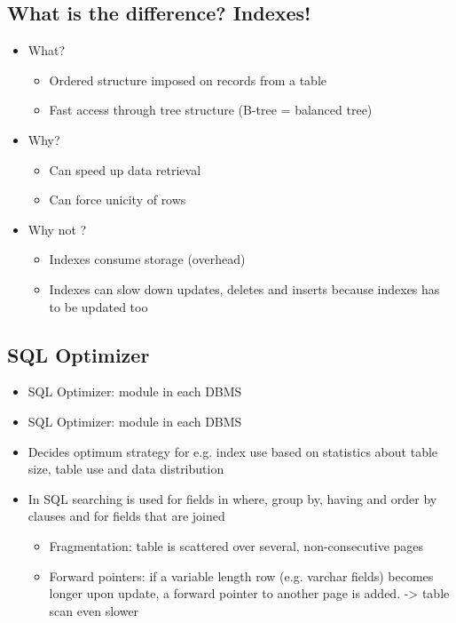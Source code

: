 \documentclass{report}
\begin{document}
    \subsection{What is the difference? Indexes!}
    \begin{itemize} 
        \item What?
            \begin{itemize} 
                \item Ordered structure imposed on records from a table
                \item Fast access through tree structure (B-tree = balanced tree)
            \end{itemize}
        \item Why?
            \begin{itemize} 
                \item Can speed up data retrieval
                \item Can force unicity of rows
            \end{itemize}
        \item Why not ?
            \begin{itemize} 
                \item Indexes consume storage (overhead)
                \item Indexes can slow down updates, deletes and inserts because indexes has to be updated too
            \end{itemize}
    \end{itemize}
    \subsection{SQL Optimizer}
        \begin{itemize} 
            \item SQL Optimizer: module in each DBMS
            \item SQL Optimizer: module in each DBMS
            \item Decides optimum strategy for e.g. index use based on statistics about table size, table use and data distribution
            \item In SQL searching is used for fields in where, group by, having and order by clauses and for fields that are joined
            \begin{itemize} 
                \item Fragmentation: table is scattered over several, non-consecutive pages
                \item Forward pointers: if a variable length row (e.g. varchar fields) becomes longer upon update, a forward pointer to another page is added. -> table scan even slower
            \end{itemize}
        \end{itemize}
\end{document}
